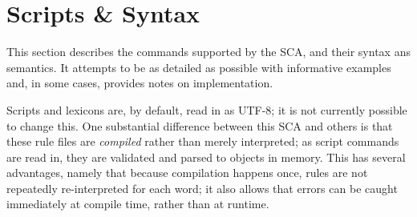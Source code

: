 \documentclass[10pt,letterpaper]{article}
\newcounter{excounter}
\newenvironment{vex}[1]{
	\refstepcounter{excounter}
	\noindent\emph{Ex.} (\arabic{excounter}\label{#1})
	\verbatim
}{\endverbatim}
\begin{document}
%




\section{Scripts \& Syntax}
\label{prt:scripts_and_syntax}
This section describes the commands supported by the SCA, and their syntax ans semantics. It attempts to be as detailed as possible with informative examples and, in some cases, provides notes on implementation.

Scripts and lexicons are, by default, read in as UTF-8; it is not currently possible to change this. One substantial difference between this SCA and others is that these rule files are \emph{compiled} rather than merely interpreted; as script commands are read in, they are validated and parsed to objects in memory. This has several advantages, namely that because compilation happens once, rules are not repeatedly re-interpreted for each word; it also allows that errors can be caught immediately at compile time, rather than at runtime.
\end{document}
